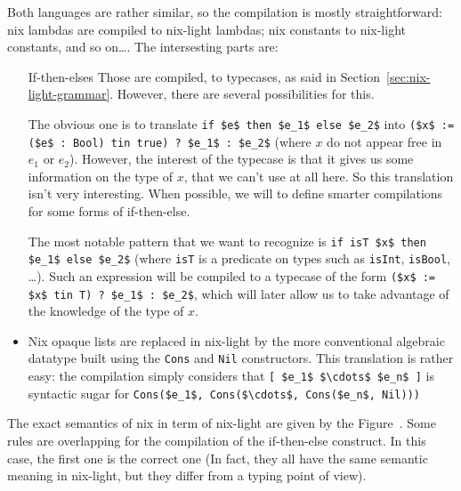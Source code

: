 Both languages are rather similar, so the compilation is mostly
straightforward: nix lambdas are compiled to nix-light lambdas; nix constants
to nix-light constants, and so on\ldots. The intersesting parts are:

\begin{itemize}
  \item[If-then-elses] Those are compiled, to typecases, as said in
    Section~\ref{sec:nix-light-grammar}. However, there are several
    possibilities for this.

    The obvious one is to translate \lstinline{if $e$ then $e_1$ else $e_2$} into
    \lstinline{($x$ := ($e$ : Bool) tin true) ? $e_1$ : $e_2$} (where $x$ do not appear
    free in $e_1$ or $e_2$).
    However, the interest of the typecase is that it gives us some information
    on the type of $x$, that we can't use at all here. So this translation
    isn't very interesting.
    When possible, we will  to define smarter compilations for some forms of
    if-then-else.

    The most notable pattern that we want to recognize is
    \lstinline{if isT $x$ then $e_1$ else $e_2$}
    (where \lstinline{isT} is a predicate on types such as
    \lstinline{isInt}, \lstinline{isBool}, \ldots).
    Such an expression will be compiled to a typecase of the form
    \lstinline{($x$ := $x$ tin T) ? $e_1$ : $e_2$}, which will later allow us to take
    advantage of the knowledge of the type of $x$.

  \item[Lists] Nix opaque lists are replaced in nix-light by the more
    conventional algebraic datatype built using the \lstinline{Cons} and
    \lstinline{Nil} constructors.
    This translation is rather easy: the compilation simply considers that
    \lstinline{[ $e_1$ $\cdots$ $e_n$ ]} is syntactic sugar for
    \lstinline{Cons($e_1$, Cons($\cdots$, Cons($e_n$, Nil)))} %
\end{itemize}

The exact semantics of nix in term of nix-light are given by the
Figure~.
Some rules are overlapping for the compilation of the if-then-else
construct. In this case, the first one is the correct one (In fact, they all
have the same semantic meaning in nix-light, but they differ from a typing
point of view).

